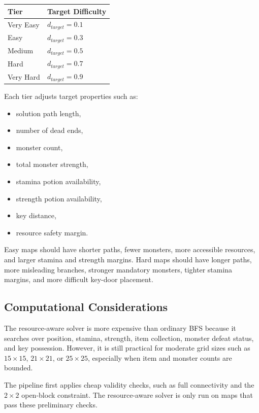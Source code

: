 \documentclass[11pt]{article}
\begin{document}
\begin{center}
\begin{tabular}{ll}
\toprule
Tier & Target Difficulty \\
\midrule
Very Easy & $d_{target} = 0.1$ \\
Easy & $d_{target} = 0.3$ \\
Medium & $d_{target} = 0.5$ \\
Hard & $d_{target} = 0.7$ \\
Very Hard & $d_{target} = 0.9$ \\
\bottomrule
\end{tabular}
\end{center}

Each tier adjusts target properties such as:

\begin{itemize}[noitemsep]
    \item solution path length,
    \item number of dead ends,
    \item monster count,
    \item total monster strength,
    \item stamina potion availability,
    \item strength potion availability,
    \item key distance,
    \item resource safety margin.
\end{itemize}

Easy maps should have shorter paths, fewer monsters, more accessible resources, and larger stamina and strength margins. Hard maps should have longer paths, more misleading branches, stronger mandatory monsters, tighter stamina margins, and more difficult key-door placement.

\subsection{Computational Considerations}

The resource-aware solver is more expensive than ordinary BFS because it searches over position, stamina, strength, item collection, monster defeat status, and key possession. However, it is still practical for moderate grid sizes such as $15 \times 15$, $21 \times 21$, or $25 \times 25$, especially when item and monster counts are bounded.

The pipeline first applies cheap validity checks, such as full connectivity and the $2 \times 2$ open-block constraint. The resource-aware solver is only run on maps that pass these preliminary checks.
\end{document}
